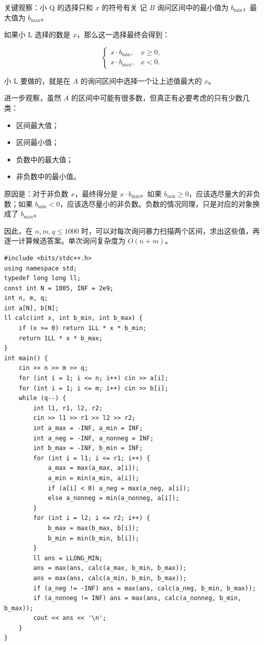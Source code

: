 \documentclass{book}
\begin{document}
\begin{keybox}{关键观察：小 Q 的选择只和 $x$ 的符号有关}
记 $B$ 询问区间中的最小值为 $b_{\min}$，最大值为 $b_{\max}$。

如果小 L 选择的数是 $x$，那么这一选择最终会得到：

$$
\begin{cases}
x\cdot b_{\min}, & x\ge 0,\\
x\cdot b_{\max}, & x<0.
\end{cases}
$$

小 L 要做的，就是在 $A$ 的询问区间中选择一个让上述值最大的 $x$。
\end{keybox}

进一步观察，虽然 $A$ 的区间中可能有很多数，但真正有必要考虑的只有少数几类：

\begin{itemize}[leftmargin=2em,itemsep=1pt,topsep=2pt,parsep=0pt,partopsep=0pt]
    \item 区间最大值；
    \item 区间最小值；
    \item 负数中的最大值；
    \item 非负数中的最小值。
\end{itemize}

原因是：对于非负数 $x$，最终得分是 $x\cdot b_{\min}$。如果 $b_{\min}\ge 0$，应该选尽量大的非负数；如果 $b_{\min}<0$，应该选尽量小的非负数。负数的情况同理，只是对应的对象换成了 $b_{\max}$。

因此，在 $n,m,q\le 1000$ 时，可以对每次询问暴力扫描两个区间，求出这些值，再逐一计算候选答案。单次询问复杂度为 $O(n+m)$。
\newpage
\begin{lstlisting}[style = code]
#include <bits/stdc++.h>
using namespace std;
typedef long long ll;
const int N = 1005, INF = 2e9;
int n, m, q;
int a[N], b[N];
ll calc(int x, int b_min, int b_max) {
    if (x >= 0) return 1LL * x * b_min;
    return 1LL * x * b_max;
}
int main() {
    cin >> n >> m >> q;
    for (int i = 1; i <= n; i++) cin >> a[i];
    for (int i = 1; i <= m; i++) cin >> b[i];
    while (q--) {
        int l1, r1, l2, r2;
        cin >> l1 >> r1 >> l2 >> r2;
        int a_max = -INF, a_min = INF;
        int a_neg = -INF, a_nonneg = INF;
        int b_max = -INF, b_min = INF;
        for (int i = l1; i <= r1; i++) {
            a_max = max(a_max, a[i]);
            a_min = min(a_min, a[i]);
            if (a[i] < 0) a_neg = max(a_neg, a[i]);
            else a_nonneg = min(a_nonneg, a[i]);
        }
        for (int i = l2; i <= r2; i++) {
            b_max = max(b_max, b[i]);
            b_min = min(b_min, b[i]);
        }
        ll ans = LLONG_MIN;
        ans = max(ans, calc(a_max, b_min, b_max));
        ans = max(ans, calc(a_min, b_min, b_max));
        if (a_neg != -INF) ans = max(ans, calc(a_neg, b_min, b_max));
        if (a_nonneg != INF) ans = max(ans, calc(a_nonneg, b_min, b_max));
        cout << ans << '\n';
    }
}
\end{lstlisting}
\newpage
\end{document}
